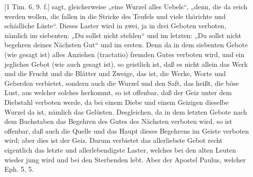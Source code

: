 [1 Tim. 6, 9. f.] sagt, gleicherweise „eine Wurzel alles Uebels“, „denn, die da reich werden wollen, die fallen in die Stricke des Teufels und viele thörichte und schädliche Lüste“. Dieses Laster wird in zwei, ja in drei Geboten verboten, nämlich im siebenten: „Du sollst nicht stehlen“ und im letzten: „Du sollst nicht begehren deines Nächsten Gut“ und im ersten. Denn da in dem siebenten Gebote (wie gesagt ist) alles Anziehen (tractatio) fremden Gutes verboten wird, und ein jegliches Gebot (wie auch gesagt ist), so geistlich ist, daß es nicht allein das Werk und die Frucht und die Blätter und Zweige, das ist, die Werke, Worte und Geberden verbietet, sondern auch die Wurzel und den Saft, das heißt, die böse Lust, aus welcher solches herkommt, so ist offenbar, daß der Geiz unter dem Diebstahl verboten werde, da bei einem Diebe und einem Geizigen dieselbe Wurzel da ist, nämlich das Gelüsten. Desgleichen, da in dem letzten Gebote nach dem Buchstaben das Begehren des Gutes des Nächsten verboten wird, so ist offenbar, daß auch die Quelle und das Haupt dieses Begehrens im Geiste verboten wird; aber dies ist der Geiz. Darum verbietet das allerliebste Gebot recht eigentlich das letzte und allerlebendigste Laster, welches bei den alten Leuten wieder jung wird und bei den Sterbenden lebt. Aber der Apostel Paulus, welcher Eph. 5, 5.
